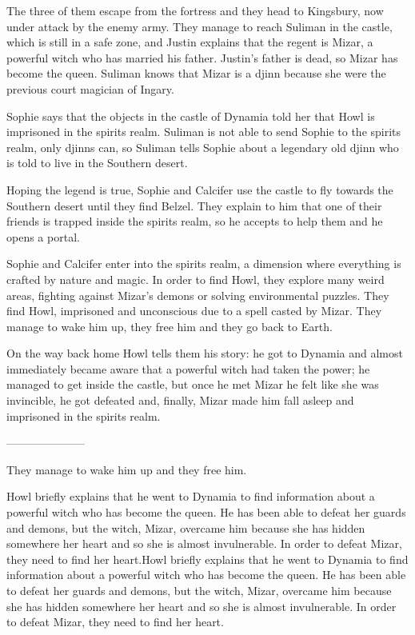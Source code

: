 The three of them escape from the fortress and they head to Kingsbury, now under attack by the enemy army. They manage to reach Suliman in the castle, which is still in a safe zone, and Justin explains that the regent is Mizar, a powerful witch who has married his father. Justin's father is dead, so Mizar has become the queen. Suliman knows that Mizar is a djinn because she were the previous court magician of Ingary.

Sophie says that the objects in the castle of Dynamia told her that Howl is imprisoned in the spirits realm. Suliman is not able to send Sophie to the spirits realm, only djinns can, so Suliman tells Sophie about a legendary old djinn who is told to live in the Southern desert.

Hoping the legend is true, Sophie and Calcifer use the castle to fly towards the Southern desert until they find Belzel. They explain to him that one of their friends is trapped inside the spirits realm, so he accepts to help them and he opens a portal.

Sophie and Calcifer enter into the spirits realm, a dimension where everything is crafted by nature and magic. In order to find Howl, they explore many weird areas, fighting against Mizar's demons or solving environmental puzzles. They find Howl, imprisoned and unconscious due to a spell casted by Mizar. They manage to wake him up, they free him and they go back to Earth.

On the way back home Howl tells them his story: he got to Dynamia and almost immediately became aware that a powerful witch had taken the power; he managed to get inside the castle, but once he met Mizar he felt like she was invincible, he got defeated and, finally, Mizar made him fall asleep and imprisoned in the spirits realm.

---------------------

They manage to wake him up and they free him.

Howl briefly explains that he went to Dynamia to find information about a powerful witch who has become the queen. He has been able to defeat her guards and demons, but the witch, Mizar, overcame him because she has hidden somewhere her heart and so she is almost invulnerable. In order to defeat Mizar, they need to find her heart.Howl briefly explains that he went to Dynamia to find information about a powerful witch who has become the queen. He has been able to defeat her guards and demons, but the witch, Mizar, overcame him because she has hidden somewhere her heart and so she is almost invulnerable. In order to defeat Mizar, they need to find her heart.

